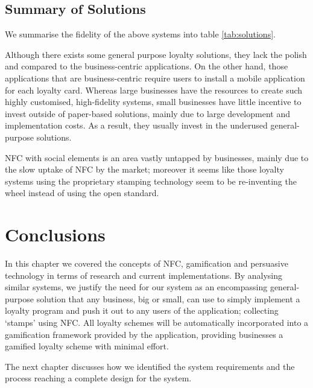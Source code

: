 \subsection{Summary of Solutions}
We summarise the fidelity of the above systems into table \ref{tab:solutions}.

\begin{table}[h]
\caption{A summary of the solutions discussed}
\label{tab:solutions}
\end{table}

Although there exists some general purpose loyalty solutions, they lack the polish and compared to the business-centric applications. On the other hand, those applications that are business-centric require users to install a mobile application for each loyalty card. Whereas large businesses have the resources to create such highly customised, high-fidelity systems, small businesses have little incentive to invest outside of paper-based solutions, mainly due to large development and implementation costs. As a result, they usually invest in the underused general-purpose solutions.

NFC with social elements is an area vastly untapped by businesses, mainly due to the slow uptake of NFC by the market; moreover it seems like those loyalty systems using the proprietary stamping technology seem to be re-inventing the wheel instead of using the open standard.

\section{Conclusions}
In this chapter we covered the concepts of NFC, gamification and persuasive technology in terms of research and current implementations. By analysing similar systems, we justify the need for our system as an encompassing general-purpose solution that any business, big or small, can use to simply implement a loyalty program and push it out to any users of the application; collecting `stamps' using NFC. All loyalty schemes will be automatically incorporated into a gamification framework provided by the application, providing businesses a gamified loyalty scheme with minimal effort.

The next chapter discusses how we identified the system requirements and the process reaching a complete design for the system.